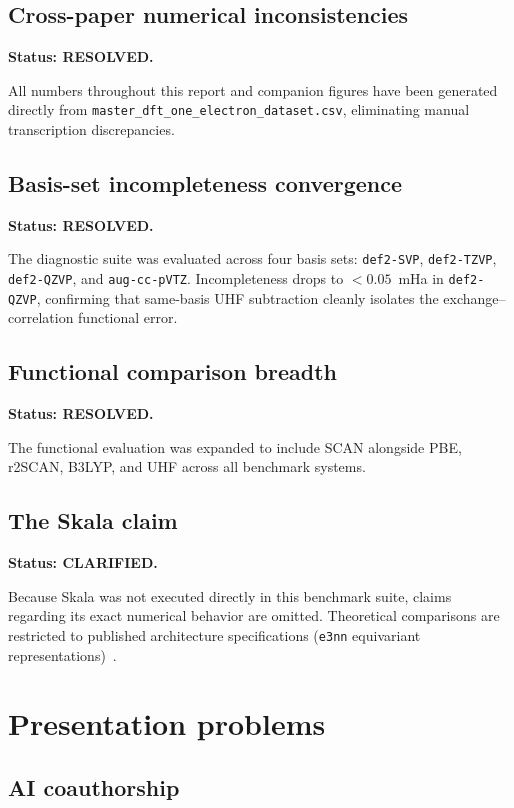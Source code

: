 \documentclass[11pt]{report}
\theoremstyle{definition}
\theoremstyle{remark}
\begin{document}
\subsection{Cross-paper numerical inconsistencies}

\textbf{Status: RESOLVED.}

All numbers throughout this report and companion figures have been generated directly
from \texttt{master\_dft\_one\_electron\_dataset.csv}, eliminating manual transcription discrepancies.

\subsection{Basis-set incompleteness convergence}

\textbf{Status: RESOLVED.}

The diagnostic suite was evaluated across four basis sets: \texttt{def2-SVP}, \texttt{def2-TZVP},
\texttt{def2-QZVP}, and \texttt{aug-cc-pVTZ}. Incompleteness drops to $< 0.05$~mHa in \texttt{def2-QZVP},
confirming that same-basis UHF subtraction cleanly isolates the exchange--correlation functional error.

\subsection{Functional comparison breadth}

\textbf{Status: RESOLVED.}

The functional evaluation was expanded to include SCAN alongside PBE, r2SCAN, B3LYP, and UHF across
all benchmark systems.

\subsection{The Skala claim}

\textbf{Status: CLARIFIED.}

Because Skala was not executed directly in this benchmark suite, claims regarding its exact
numerical behavior are omitted. Theoretical comparisons are restricted to published architecture
specifications (\texttt{e3nn} equivariant representations)~\cite{Skala2025,e3nn}.

\section{Presentation problems}

\subsection{AI coauthorship}
\end{document}
